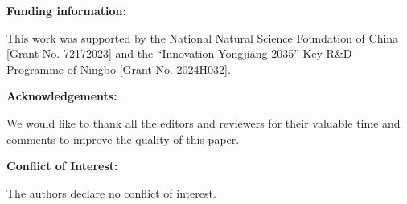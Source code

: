 \documentclass[12pt]{article}
\begin{document}
\vspace{1em}

\noindent\textbf{Funding information:}

This work was supported by the National Natural Science Foundation of China [Grant No. 72172023] and the ``Innovation Yongjiang 2035'' Key R\&D Programme of Ningbo [Grant No. 2024H032].

\vspace{1em}

\noindent\textbf{Acknowledgements:}

We would like to thank all the editors and reviewers for their valuable time and comments to improve the quality of this paper.

\vspace{1em}

\noindent\textbf{Conflict of Interest:}

The authors declare no conflict of interest.
\end{document}
